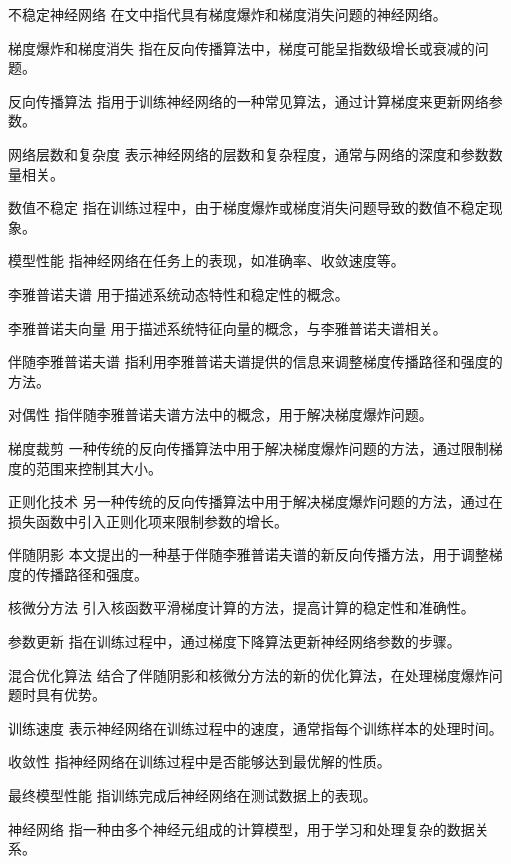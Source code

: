 
\begin{denotation}[3cm]
  \item[不稳定神经网络] 在文中指代具有梯度爆炸和梯度消失问题的神经网络。
  \item[梯度爆炸和梯度消失] 指在反向传播算法中，梯度可能呈指数级增长或衰减的问题。
  \item[反向传播算法] 指用于训练神经网络的一种常见算法，通过计算梯度来更新网络参数。
  \item[网络层数和复杂度] 表示神经网络的层数和复杂程度，通常与网络的深度和参数数量相关。
  \item[数值不稳定] 指在训练过程中，由于梯度爆炸或梯度消失问题导致的数值不稳定现象。
  \item[模型性能] 指神经网络在任务上的表现，如准确率、收敛速度等。
  \item[李雅普诺夫谱] 用于描述系统动态特性和稳定性的概念。
  \item[李雅普诺夫向量] 用于描述系统特征向量的概念，与李雅普诺夫谱相关。
  \item[伴随李雅普诺夫谱] 指利用李雅普诺夫谱提供的信息来调整梯度传播路径和强度的方法。
  \item[对偶性] 指伴随李雅普诺夫谱方法中的概念，用于解决梯度爆炸问题。
  \item[梯度裁剪] 一种传统的反向传播算法中用于解决梯度爆炸问题的方法，通过限制梯度的范围来控制其大小。
  \item[正则化技术] 另一种传统的反向传播算法中用于解决梯度爆炸问题的方法，通过在损失函数中引入正则化项来限制参数的增长。
  \item[伴随阴影] 本文提出的一种基于伴随李雅普诺夫谱的新反向传播方法，用于调整梯度的传播路径和强度。
  \item[核微分方法] 引入核函数平滑梯度计算的方法，提高计算的稳定性和准确性。
  \item[参数更新] 指在训练过程中，通过梯度下降算法更新神经网络参数的步骤。
  \item[混合优化算法] 结合了伴随阴影和核微分方法的新的优化算法，在处理梯度爆炸问题时具有优势。
  \item[训练速度] 表示神经网络在训练过程中的速度，通常指每个训练样本的处理时间。
  \item[收敛性] 指神经网络在训练过程中是否能够达到最优解的性质。
  \item[最终模型性能] 指训练完成后神经网络在测试数据上的表现。
  \item[神经网络] 指一种由多个神经元组成的计算模型，用于学习和处理复杂的数据关系。
\end{denotation}



